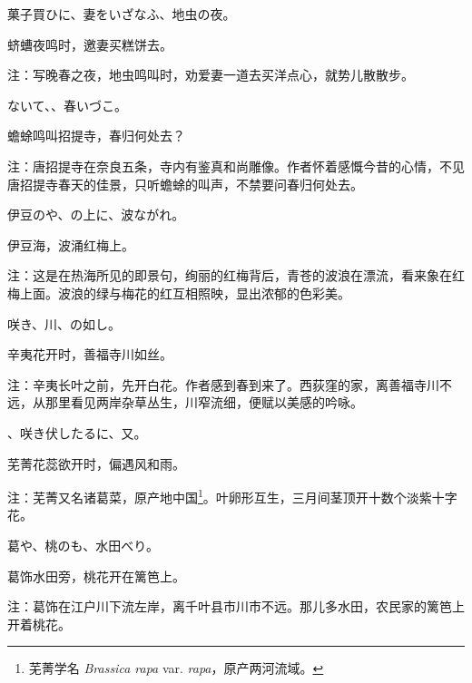 \begin{haiku}
    {\FH 菓子買ひに、妻をいざなふ、地虫の夜。}

    {\FK 蛴螬夜鸣时，邀妻买糕饼去。}

    {\FT 注：写晚春之夜，地虫鸣叫时，劝爱妻一道去买洋点心，就势儿散散步。}
\end{haiku}

\begin{haiku}
    {\FH {}ないて、、春いづこ。}

    {\FK 蟾蜍鸣叫招提寺，春归何处去？}

    {\FT 注：唐招提寺在奈良五条，寺内有鉴真和尚雕像。作者怀着感慨今昔的心情，不见唐招提寺春天的佳景，只听蟾蜍的叫声，不禁要问春归何处去。}
\end{haiku}

\begin{haiku}
    {\FH 伊豆のや、の上に、波ながれ。}

    {\FK 伊豆海，波涌红梅上。}

    {\FT 注：这是在热海所见的即景句，绚丽的红梅背后，青苍的波浪在漂流，看来象在红梅上面。波浪的绿与梅花的红互相照映，显出浓郁的色彩美。}
\end{haiku}

\begin{haiku}
    {\FH {}咲き、川、の如し。}

    {\FK 辛夷花开时，善福寺川如丝。}

    {\FT 注：辛夷长叶之前，先开白花。作者感到春到来了。西荻窪的家，离善福寺川不远，从那里看见两岸杂草丛生，川窄流细，便赋以美感的吟咏。}
\end{haiku}

\begin{haiku}
    {\FH {}、咲き伏したるに、又。}

    {\FK 芜菁花蕊欲开时，偏遇风和雨。}

    {\FT 注：芜菁又名诸葛菜，原产地中国\footnote{{\FT 芜菁学名} \emph{Brassica rapa} var. \emph{rapa}{\FT ，原产两河流域。}}。叶卵形互生，三月间茎顶开十数个淡紫十字花。}
\end{haiku}

\begin{haiku}
    {\FH 葛や、桃のも、水田べり。}

    {\FK 葛饰水田旁，桃花开在篱笆上。}

    {\FT 注：葛饰在江户川下流左岸，离千叶县市川市不远。那儿多水田，农民家的篱笆上开着桃花。}
\end{haiku}

